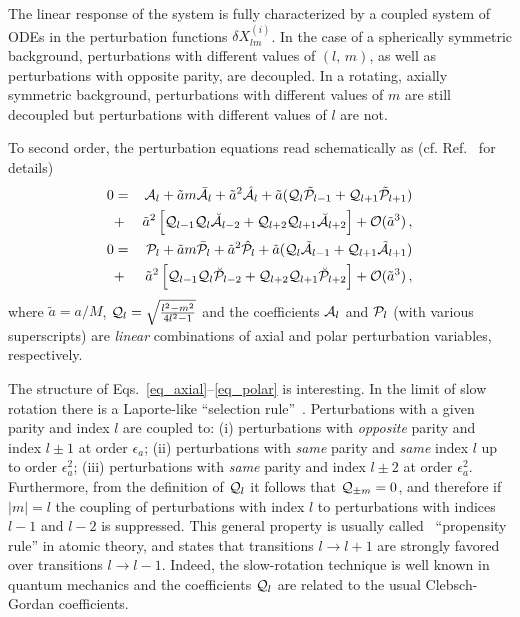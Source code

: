 \documentclass[11pt]{article}
\newcommand{\nn}{\nonumber}
\numberwithin{equation}{section} %
\begin{document}
The linear response of the system is fully characterized by a coupled system of ODEs in the perturbation functions $\delta X^{(i)}_{l  m}$.  
In the case of a spherically symmetric background,
perturbations with different values of $(l,\,m)$, as well as
perturbations with opposite parity, are decoupled. In a rotating,
axially symmetric background, perturbations with different values of
$m$ are still decoupled but perturbations with different values of
$l$ are not.

To second order, the perturbation equations read schematically as (cf. Ref.~\cite{Pani:2013pma} for details)
%
\begin{eqnarray}
0&=&{\cal A}_{l}+\tilde a m \bar{\cal A}_{{l}}+\tilde{a}^2 \hat{{\cal A}}_l+\tilde a ({\cal Q}_{{l}}\tilde{\cal P}_{l-1}+{\cal Q}_{l+1}\tilde{\cal P}_{l+1})\nn\\
&+&\tilde{a}^2 \left[{\cal Q}_{l-1} {\cal Q}_l \breve{{\cal A}}_{l-2} + {\cal Q}_{l+2} {\cal Q}_{l+1} \breve{{\cal A}}_{l+2} \right]+{\cal O}(\tilde{a}^3)\,,\label{eq_axial}\\
0&=&{\cal P}_{l}+\tilde a m \bar{\cal P}_{{l}}+\tilde{a}^2 \hat{{\cal P}}_l+\tilde a ({\cal Q}_{{l}}\tilde{\cal A}_{l-1}+{\cal Q}_{l+1}\tilde{\cal A}_{l+1})\nn\\
&+&\tilde{a}^2 \left[{\cal Q}_{l-1} {\cal Q}_l \breve{{\cal P}}_{l-2} + {\cal Q}_{l+2} {\cal Q}_{l+1} \breve{{\cal P}}_{l+2} \right]+{\cal O}(\tilde{a}^3)\,,\label{eq_polar}
\end{eqnarray}
where $\tilde{a}=a/M$, ${\cal Q}_l=\sqrt{\frac{l^2-m^2}{4l^2-1}}$ and the
coefficients ${\cal A}_l$ and ${\cal P}_l$ (with various
superscripts) are \emph{linear} combinations of axial and polar
perturbation variables, respectively.

The structure of Eqs.~\eqref{eq_axial}--\eqref{eq_polar} is interesting.
In the limit of slow rotation there is a Laporte-like
``selection rule''~\cite{ChandraFerrari91}. Perturbations with a given parity and index $l$ are coupled to: (i)
perturbations with \emph{opposite} parity and index $l\pm1$ at
order $\epsilon_a$; (ii) perturbations with \emph{same} parity and
\emph{same} index $l$ up to order $\epsilon_a^2$; (iii)
perturbations with \emph{same} parity and index $l\pm2$ at order
$\epsilon_a^2$. 
%
Furthermore, from the definition of ${\cal Q}_l$ it follows that ${\cal Q}_{\pm m}=0$, and
therefore if $|m|=l$ the coupling of perturbations with index
$l$ to perturbations with indices $l-1$ and $l-2$ is
suppressed. This general property is usually called~\cite{ChandraFerrari91} ``propensity
rule'' in atomic theory, and states that transitions $l\to l+1$
are strongly favored over transitions $l\to l-1$. Indeed, the slow-rotation technique is well known in quantum mechanics and the coefficients ${\cal Q}_{l}$ are related to the
usual Clebsch-Gordan coefficients.
\end{document}
